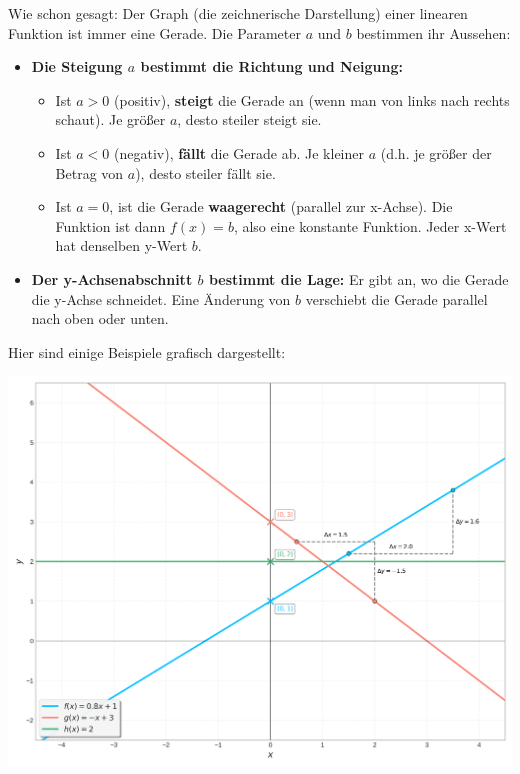 Wie schon gesagt: Der Graph (die zeichnerische Darstellung) einer linearen Funktion ist immer eine Gerade. Die Parameter $a$ und $b$ bestimmen ihr Aussehen:

\begin{itemize}
    \item \textbf{Die Steigung $a$ bestimmt die Richtung und Neigung:}
        \begin{itemize}
            \item Ist $a > 0$ (positiv), \textbf{steigt} die Gerade an (wenn man von links nach rechts schaut). Je größer $a$, desto steiler steigt sie.
            \item Ist $a < 0$ (negativ), \textbf{fällt} die Gerade ab. Je kleiner $a$ (d.h. je größer der Betrag von $a$), desto steiler fällt sie.
            \item Ist $a = 0$, ist die Gerade \textbf{waagerecht} (parallel zur x-Achse). Die Funktion ist dann $f(x)=b$, also eine konstante Funktion. Jeder x-Wert hat denselben y-Wert $b$.
        \end{itemize}
    \item \textbf{Der y-Achsenabschnitt $b$ bestimmt die Lage:}
        Er gibt an, wo die Gerade die y-Achse schneidet. Eine Änderung von $b$ verschiebt die Gerade parallel nach oben oder unten.
\end{itemize}

Hier sind einige Beispiele grafisch dargestellt:
\begin{center} %
    \includegraphics[scale=0.5]{grafiken/Lineare_Funktionen_Beispiele.png}
    \label{fig:lineare_funktionen_beispiele}
\end{center}


